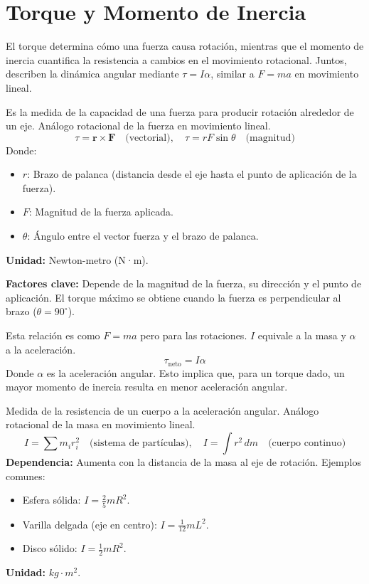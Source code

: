 \section{Torque y Momento de Inercia}
\label{sec:torque_y_momento_de_inercia}

El torque determina cómo una fuerza causa rotación, mientras que el momento de inercia cuantifica la resistencia a cambios en el movimiento rotacional. Juntos, describen la dinámica angular mediante \( \tau = I\alpha \), similar a \( F = ma \) en movimiento lineal.

\begin{tcolorbox}[remember, title=Torque (\(\tau\))]
  Es la medida de la capacidad de una fuerza para producir rotación alrededor de un eje. Análogo rotacional de la fuerza en movimiento lineal.  
  \[
    \tau = \mathbf{r} \times \mathbf{F} \quad \text{(vectorial)}, \quad \tau = rF\sin\theta \quad \text{(magnitud)}
  \]  
  Donde:
  \begin{itemize}
    \item \( r \): Brazo de palanca (distancia desde el eje hasta el punto de aplicación de la fuerza).
    \item \( F \): Magnitud de la fuerza aplicada.
    \item \( \theta \): Ángulo entre el vector fuerza y el brazo de palanca.
  \end{itemize}
  \textbf{Unidad:} Newton-metro (N·m).  

  \noindent\textbf{Factores clave:} Depende de la magnitud de la fuerza, su dirección y el punto de aplicación. El torque máximo se obtiene cuando la fuerza es perpendicular al brazo (\( \theta = 90^\circ \)).
\end{tcolorbox}

\begin{tcolorbox}[remember, title=Relación Fundamental (Segunda Ley de Newton para Rotación)]
  Esta relación es como \(F=ma\) pero para las rotaciones. \(I\) equivale a la masa y \(\alpha\) a la aceleración.
  \[
  \tau_{\text{neto}} = I \alpha
  \]  
  Donde \( \alpha \) es la aceleración angular. Esto implica que, para un torque dado, un mayor momento de inercia resulta en menor aceleración angular.
\end{tcolorbox}

\begin{tcolorbox}[remember, title=Momento de Inercia (\(I\))]
  Medida de la resistencia de un cuerpo a la aceleración angular. Análogo rotacional de la masa en movimiento lineal.  
  \[
    I = \sum m_i r_i^2 \quad \text{(sistema de partículas)}, \quad I = \int r^2 \, dm \quad \text{(cuerpo continuo)}
  \]  
  \textbf{Dependencia:} Aumenta con la distancia de la masa al eje de rotación. Ejemplos comunes:
  \begin{itemize}
    \item Esfera sólida: \( I = \frac{2}{5} mR^2 \).
    \item Varilla delgada (eje en centro): \( I = \frac{1}{12} mL^2 \).
    \item Disco sólido: \( I = \frac{1}{2} mR^2 \).
  \end{itemize}
  \textbf{Unidad:} \(kg\cdot m^2\).  
\end{tcolorbox}
